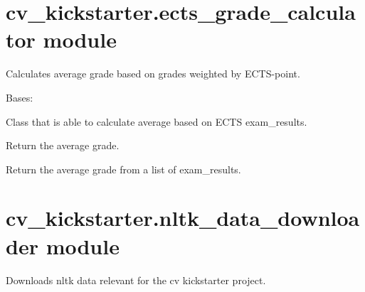 \documentclass[letterpaper,10pt,english]{sphinxmanual}
\begin{document}
\section{cv\_kickstarter.ects\_grade\_calculator module}
\label{cv_kickstarter:cv-kickstarter-ects-grade-calculator-module}\label{cv_kickstarter:module-cv_kickstarter.ects_grade_calculator}
Calculates average grade based on grades weighted by ECTS-point.

\begin{fulllineitems}
\label{cv_kickstarter:cv_kickstarter.ects_grade_calculator.GradeAverageCalculator}
Bases: 

Class that is able to calculate average based on ECTS exam\_results.

\begin{fulllineitems}
\label{cv_kickstarter:cv_kickstarter.ects_grade_calculator.GradeAverageCalculator.average_grade}
Return the average grade.

\end{fulllineitems}


\end{fulllineitems}


\begin{fulllineitems}
\label{cv_kickstarter:cv_kickstarter.ects_grade_calculator.average_grade}
Return the average grade from a list of exam\_results.

\end{fulllineitems}



\section{cv\_kickstarter.nltk\_data\_downloader module}
\label{cv_kickstarter:cv-kickstarter-nltk-data-downloader-module}\label{cv_kickstarter:module-cv_kickstarter.nltk_data_downloader}
Downloads nltk data relevant for the cv kickstarter project.
\end{document}

